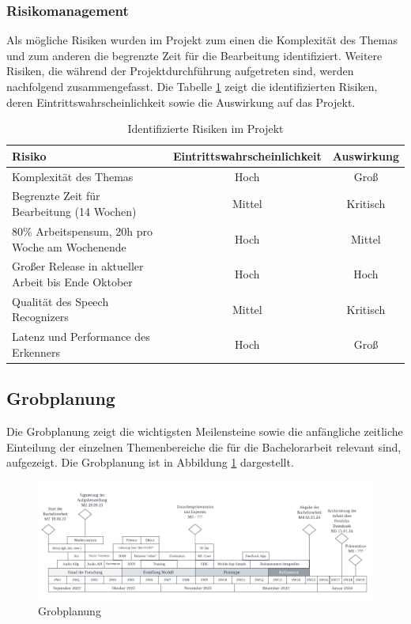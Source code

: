 \documentclass[main.tex]{subfiles} %
\begin{document}
\subsubsection{Risikomanagement}
Als mögliche Risiken wurden im Projekt zum einen die Komplexität des Themas und zum anderen die
begrenzte Zeit für die Bearbeitung identifiziert. Weitere Risiken, die während der 
Projektdurchführung aufgetreten sind, werden nachfolgend zusammengefasst. Die Tabelle 
\ref{tab:risiken} zeigt die identifizierten Risiken, deren Eintrittswahrscheinlichkeit sowie die 
Auswirkung auf das Projekt.

\begin{table}[h]
    \centering
    \begin{tabular}{|l|c|c|}
        \hline
        \textbf{Risiko} & \textbf{Eintrittswahrscheinlichkeit} & \textbf{Auswirkung} \\
        \hline
        Komplexität des Themas & Hoch & Groß \\
        \hline
        Begrenzte Zeit für Bearbeitung (14 Wochen) & Mittel & Kritisch \\
        \hline
        80\% Arbeitspensum, 20h pro Woche am Wochenende & Hoch & Mittel \\
        \hline
        Großer Release in aktueller Arbeit bis Ende Oktober & Hoch & Hoch \\
        \hline
        Qualität des Speech Recognizers & Mittel & Kritisch \\
        \hline
        Latenz und Performance des Erkenners & Hoch & Groß \\
        \hline
    \end{tabular}
    \caption{Identifizierte Risiken im Projekt}
    \label{tab:risiken}
\end{table}



\begin{landscape}
    \subsection{Grobplanung}
    Die Grobplanung zeigt die wichtigsten Meilensteine sowie die anfängliche zeitliche Einteilung 
    der einzelnen Themenbereiche die für die Bachelorarbeit relevant sind, aufgezeigt. Die
    Grobplanung ist in Abbildung \ref{fig:grobplanung} dargestellt.

    \begin{figure}[!htb]
        \centering
        \includegraphics[width=\linewidth]{img/projectplan.pdf}
        \caption{Grobplanung}
        \label{fig:grobplanung}
    \end{figure}
\end{landscape}
\end{document}
